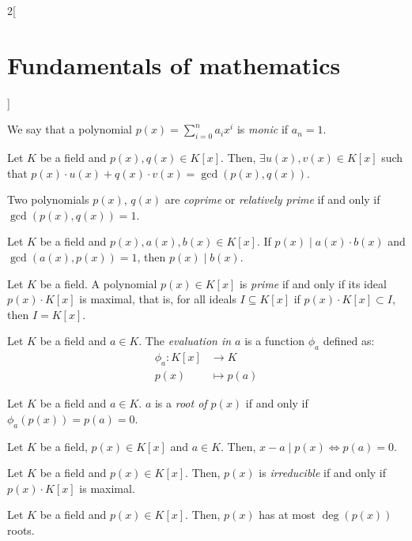 \documentclass[../../../main.tex]{subfiles}
\begin{document}
\begin{multicols}{2}[\section{Fundamentals of mathematics}]
\begin{definition}
  \end{definition}
  \begin{definition}
    We say that a polynomial $p(x)=\sum_{i=0}^na_ix^i$ is \textit{monic} if $a_n=1$.
  \end{definition}
  \begin{theorem}
    Let $K$ be a field and $p(x),q(x)\in K[x]$. Then, $\exists u(x), v(x)\in K[x]$ such that $p(x)\cdot u(x)+q(x)\cdot v(x)=\gcd(p(x),q(x))$.
  \end{theorem}
  \begin{definition}
    Two polynomials $p(x)$, $q(x)$ are \textit{coprime} or \textit{relatively prime} if and only if $\gcd(p(x),q(x))=1$.
  \end{definition}
  \begin{theorem}
    Let $K$ be a field and $p(x),a(x),b(x)\in K[x]$. If $p(x)\mid a(x)\cdot b(x)$ and $\gcd(a(x),p(x))=1$, then $p(x)\mid b(x)$.
  \end{theorem}
  \begin{definition}
    Let $K$ be a field. A polynomial $p(x)\in K[x]$ is \textit{prime} if and only if its ideal $p(x)\cdot K[x]$ is maximal, that is, for all ideals $I\subseteq K[x]$ if $p(x)\cdot K[x] \subset I$, then $I=K[x]$.
  \end{definition}
  \begin{definition}
    Let $K$ be a field and $a\in K$. The \textit{evaluation in $a$} is a function $\phi_a$ defined as:
    \begin{align*}
      \phi_a:K[x] & \longrightarrow K \\
      p(x)        & \longmapsto p(a)
    \end{align*}
  \end{definition}
  \begin{definition}
    Let $K$ be a field and $a\in K$. $a$ is a \textit{root of $p(x)$} if and only if $\phi_a(p(x))=p(a)=0$.
  \end{definition}
  \begin{theorem}
    Let $K$ be a field, $p(x)\in K[x]$ and $a\in K$. Then, $x-a\mid p(x)\iff p(a)=0$.
  \end{theorem}
  \begin{definition}
    Let $K$ be a field and $p(x)\in K[x]$. Then, $p(x)$ is \textit{irreducible} if and only if $p(x)\cdot K[x]$ is maximal.
  \end{definition}
  \begin{theorem}
    Let $K$ be a field and $p(x)\in K[x]$. Then, $p(x)$ has at most $\deg(p(x))$ roots.

\end{theorem}
\end{multicols}
\end{document}
